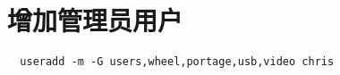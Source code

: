 \chapter{增加管理员用户}
\begin{lstlisting}
  useradd -m -G users,wheel,portage,usb,video chris
\end{lstlisting}
